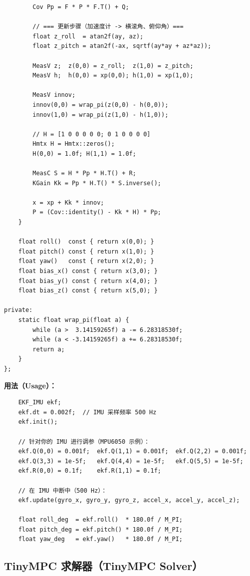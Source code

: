 \begin{verbatim}
        Cov Pp = F * P * F.T() + Q;

        // === 更新步骤（加速度计 -> 横滚角、俯仰角）===
        float z_roll  = atan2f(ay, az);
        float z_pitch = atan2f(-ax, sqrtf(ay*ay + az*az));

        MeasV z;  z(0,0) = z_roll;  z(1,0) = z_pitch;
        MeasV h;  h(0,0) = xp(0,0); h(1,0) = xp(1,0);

        MeasV innov;
        innov(0,0) = wrap_pi(z(0,0) - h(0,0));
        innov(1,0) = wrap_pi(z(1,0) - h(1,0));

        // H = [1 0 0 0 0 0; 0 1 0 0 0 0]
        Hmtx H = Hmtx::zeros();
        H(0,0) = 1.0f; H(1,1) = 1.0f;

        MeasC S = H * Pp * H.T() + R;
        KGain Kk = Pp * H.T() * S.inverse();

        x = xp + Kk * innov;
        P = (Cov::identity() - Kk * H) * Pp;
    }

    float roll()  const { return x(0,0); }
    float pitch() const { return x(1,0); }
    float yaw()   const { return x(2,0); }
    float bias_x() const { return x(3,0); }
    float bias_y() const { return x(4,0); }
    float bias_z() const { return x(5,0); }

private:
    static float wrap_pi(float a) {
        while (a >  3.14159265f) a -= 6.28318530f;
        while (a < -3.14159265f) a += 6.28318530f;
        return a;
    }
};
\end{verbatim}

\textbf{用法（Usage）：}
\begin{verbatim}
    EKF_IMU ekf;
    ekf.dt = 0.002f;  // IMU 采样频率 500 Hz
    ekf.init();

    // 针对你的 IMU 进行调参（MPU6050 示例）：
    ekf.Q(0,0) = 0.001f;  ekf.Q(1,1) = 0.001f;  ekf.Q(2,2) = 0.001f;
    ekf.Q(3,3) = 1e-5f;   ekf.Q(4,4) = 1e-5f;   ekf.Q(5,5) = 1e-5f;
    ekf.R(0,0) = 0.1f;    ekf.R(1,1) = 0.1f;

    // 在 IMU 中断中（500 Hz）：
    ekf.update(gyro_x, gyro_y, gyro_z, accel_x, accel_y, accel_z);

    float roll_deg  = ekf.roll()  * 180.0f / M_PI;
    float pitch_deg = ekf.pitch() * 180.0f / M_PI;
    float yaw_deg   = ekf.yaw()   * 180.0f / M_PI;
\end{verbatim}

\subsection{TinyMPC 求解器（TinyMPC Solver）}

